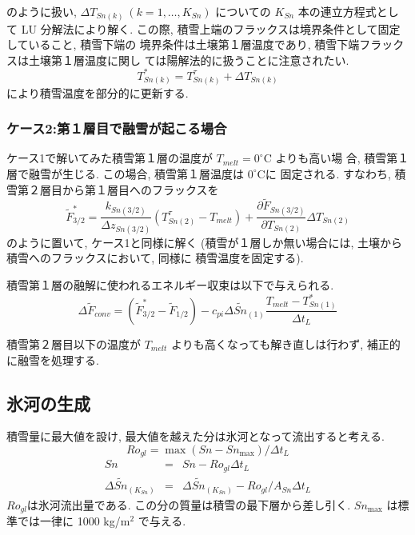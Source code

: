 のように扱い, $\Delta T_{Sn(k)}\ (k=1,\ldots,K_{Sn})$ についての
$K_{Sn}$ 本の連立方程式として LU 分解法により解く. 
この際, 積雪上端のフラックスは境界条件として固定していること, 積雪下端の
境界条件は土壌第１層温度であり, 積雪下端フラックスは土壌第１層温度に関し
ては陽解法的に扱うことに注意されたい. 
\begin{equation}
 T_{Sn(k)}^* = T_{Sn(k)}^{\tau} + \Delta T_{Sn(k)}
\end{equation}
により積雪温度を部分的に更新する. 

\subsubsection{ケース2:第１層目で融雪が起こる場合}

ケース1で解いてみた積雪第１層の温度が $T_{melt} = 0^{\circ}$C よりも高い場
合, 積雪第１層で融雪が生じる. この場合, 積雪第１層温度は $0^{\circ}$Cに
固定される. すなわち, 積雪第２層目から第１層目へのフラックスを
\begin{equation}
 \widetilde{F}_{3/2}^{*} =
\frac{k_{Sn(3/2)}}{\Delta z_{Sn(3/2)}} (T_{Sn(2)}^{\tau} - T_{melt})
+\frac{\partial \widetilde{F}_{Sn(3/2)}}{\partial T_{Sn(2)}} 
 \Delta T_{Sn(2)}
\end{equation}
のように置いて, ケース1と同様に解く
(積雪が１層しか無い場合には, 土壌から積雪へのフラックスにおいて, 同様に
積雪温度を固定する). 

積雪第１層の融解に使われるエネルギー収束は以下で与えられる. 
\begin{equation}
 \Delta \widetilde{F}_{conv} = (\widetilde{F}_{3/2}^{*} - \widetilde{F}_{1/2})
  - c_{pi}\Delta \widetilde{Sn}_{(1)} \frac{T_{melt}-T_{Sn(1)}^*}{\Delta t_L} 
\end{equation}

積雪第２層目以下の温度が $T_{melt}$ よりも高くなっても解き直しは行わず,
補正的に融雪を処理する. 

\subsection{氷河の生成}

積雪量に最大値を設け, 最大値を越えた分は氷河となって流出すると考える. 
\begin{equation}
 Ro_{gl} = \max( Sn - Sn_{\max} ) / \Delta t_L
\end{equation}
\begin{eqnarray}
 Sn &=& Sn - Ro_{gl} \Delta t_L \\
 \Delta \widetilde{Sn}_{(K_{Sn})} &=& \Delta \widetilde{Sn}_{(K_{Sn})} 
 - Ro_{gl} / A_{Sn} \Delta t_L
\end{eqnarray}
$Ro_{gl}$は氷河流出量である. この分の質量は積雪の最下層から差し引く. 
$Sn_{\max}$ は標準では一律に 1000 kg/m$^2$ で与える. 

